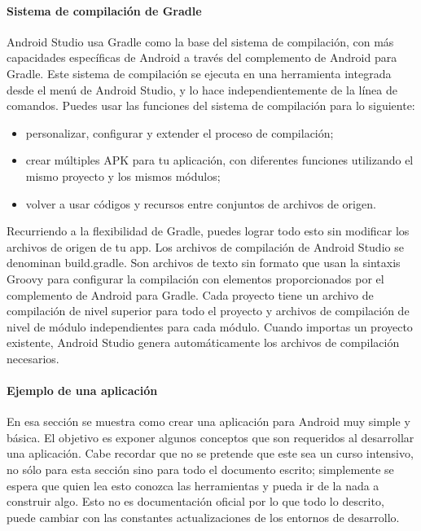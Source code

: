 \paragraph{Sistema de compilación de Gradle}
\label{\detokenize{dev_docs:sistema-de-compilacion-de-gradle}}
Android Studio usa Gradle como la base del sistema de compilación, con más capacidades específicas de Android a través del complemento de Android para Gradle. Este sistema de compilación se ejecuta en una herramienta integrada desde el menú de Android Studio, y lo hace independientemente de la línea de comandos. Puedes usar las funciones del sistema de compilación para lo siguiente:
\begin{itemize}
\item {} 
personalizar, configurar y extender el proceso de compilación;

\item {} 
crear múltiples APK para tu aplicación, con diferentes funciones utilizando el mismo proyecto y los mismos módulos;

\item {} 
volver a usar códigos y recursos entre conjuntos de archivos de origen.

\end{itemize}

Recurriendo a la flexibilidad de Gradle, puedes lograr todo esto sin modificar los archivos de origen de tu app. Los archivos de compilación de Android Studio se denominan build.gradle. Son archivos de texto sin formato que usan la sintaxis Groovy para configurar la compilación con elementos proporcionados por el complemento de Android para Gradle. Cada proyecto tiene un archivo de compilación de nivel superior para todo el proyecto y archivos de compilación de nivel de módulo independientes para cada módulo. Cuando importas un proyecto existente, Android Studio genera automáticamente los archivos de compilación necesarios.


\paragraph{Ejemplo de una aplicación}
\label{\detokenize{dev_docs:una-primera-aplicacion}}
En esa sección se muestra como crear una aplicación para Android muy simple
y básica. El objetivo es exponer algunos conceptos que son requeridos al
desarrollar una aplicación. Cabe recordar que no se pretende que este sea un
curso intensivo, no sólo para esta sección sino para todo el documento escrito;
simplemente se espera que quien lea esto conozca las herramientas y pueda ir
de la nada a construir algo. Esto no es documentación oficial por lo que todo
lo descrito, puede cambiar con las constantes actualizaciones de los entornos
de desarrollo.

